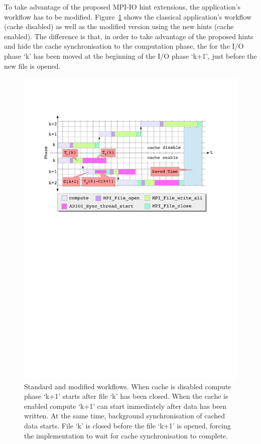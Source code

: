 To take advantage of the proposed MPI-IO hint extensions, the application's workflow has to be modified. Figure~\ref{figure: workflow3} shows the classical application's workflow (cache disabled) as well as the modified version using the new hints (cache enabled). The difference is that, in order to take advantage of the proposed hints and hide the cache synchronisation to the computation phase, the  for the I/O phase `k' has been moved at the beginning of the I/O phase `k+1', just before the new file is opened.
\begin{figure}[!htb]
  \centering
  \includegraphics[width=\columnwidth]{figures/workflow3}
  \caption{Standard and modified workflows. When cache is disabled compute phase `k+1' starts after file `k' has been closed. When the cache is enabled compute `k+1' can start immediately after data has been written. At the same time, background synchronisation of cached data starts. File `k' is closed before the file `k+1' is opened, forcing the implementation to wait for cache synchronisation to complete.}
  \label{figure: workflow3}
\end{figure}

